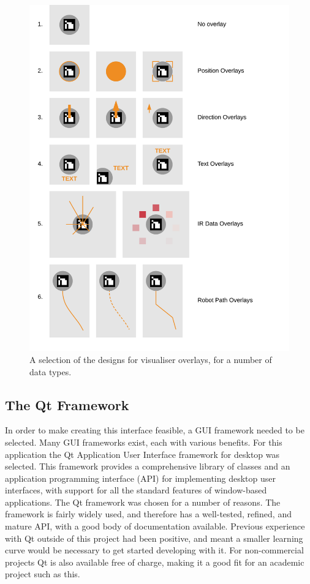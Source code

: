 \begin{figure}
	\centering
	\includegraphics[scale=1]{Figures/OverlayDesigns.png}
	\decoRule
	\caption[Visualiser Overlay Designs]{A selection of the designs for visualiser overlays, for a number of data types.}
	\label{fig:OverlayDesigns}
\end{figure}

\subsection{The Qt Framework}
In order to make creating this interface feasible, a GUI framework needed to be selected. Many GUI frameworks exist, each with various benefits. For this application the Qt Application User Interface framework for desktop was selected. This framework provides a comprehensive library of classes and an application programming interface (API) for implementing desktop user interfaces, with support for all the standard features of window-based applications. The Qt framework was chosen for a number of reasons. The framework is fairly widely used, and therefore has a well-tested, refined, and mature API, with a good body of documentation available. Previous experience with Qt outside of this project had been positive, and meant a smaller learning curve would be necessary to get started developing with it. For non-commercial projects Qt is also available free of charge, making it a good fit for an academic project such as this.

